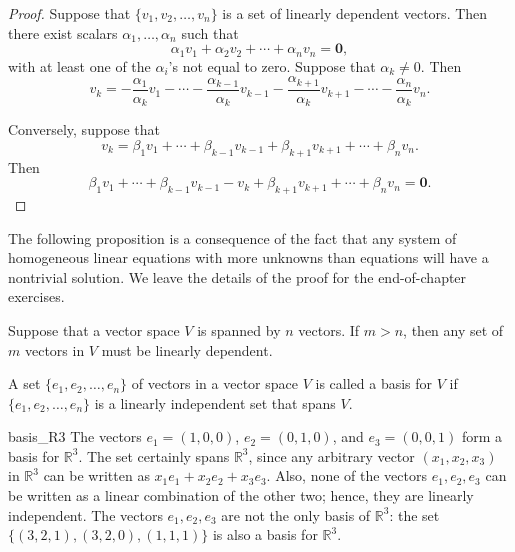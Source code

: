 \begin{proof}
Suppose that $\{ v_1, v_2, \dots, v_n \}$ is a set of linearly dependent
vectors.  Then there exist scalars $\alpha_1, \ldots, \alpha_n$
such that
\[
\alpha_1 v_1 + \alpha_2 v_2 + \cdots + \alpha_n v_n = {\mathbf 0 },
\]
with at least one of the $\alpha_i$'s not equal to zero.  Suppose that
$\alpha_k \neq 0$. Then 
\[
v_k = - \frac{\alpha_1}{\alpha_k} v_1 
- \cdots 
- \frac{\alpha_{k-1}}{\alpha_k}	v_{k-1}
- \frac{\alpha_{k+1}}{\alpha_k}	v_{k+1}
- \cdots 
- \frac{\alpha_n}{\alpha_k} v_n.
\]


Conversely, suppose that 
\[
v_k = \beta_1 v_1 
+ \cdots 
+ \beta_{k-1} v_{k-1}
+ \beta_{k+1} v_{k+1}
+ \cdots 
+ \beta_n v_n.
\]
Then
\[
\beta_1 v_1 
+ \cdots 
+ \beta_{k-1} v_{k-1}
- v_k
+ \beta_{k+1} v_{k+1}
+ \cdots 
+ \beta_n v_n = {\mathbf 0}.
\]
\end{proof}

\medskip


The following proposition is a consequence of the fact that any system
of homogeneous linear equations with more unknowns than equations will
have a nontrivial solution.  We leave the details of the proof for the
end-of-chapter exercises. 
 

\begin{proposition}\label{vect:linearlyindependent}
Suppose that a vector space $V$ is spanned by $n$ vectors. If $m > n$,
then any set of $m$ vectors in $V$ must be linearly dependent. 
\end{proposition}
 
  
A set $\{ e_1, e_2, \ldots, e_n \}$ of vectors in a vector space $V$
is called a {\bfi basis\/} for $V$ if $\{
e_1, e_2, \ldots, e_n \}$ is a linearly independent set that spans
$V$.

 
 
\begin{example}{basis_R3}
The vectors $e_1 = (1, 0, 0)$, $e_2 = (0, 1, 0)$, and $e_3 =(0, 0, 1)$
form a basis for ${\mathbb R}^3$.  The set certainly spans ${\mathbb R}^3$,
since any arbitrary vector $(x_1, x_2, x_3)$ in ${\mathbb R}^3$ can be
written as $x_1 e_1 + x_2 e_2 + x_3 e_3$. Also, none of the vectors
$e_1, e_2, e_3$ can be written as a linear combination of the other
two; hence, they are linearly independent.  The vectors $e_1, e_2,
e_3$ are not the only basis of ${\mathbb R}^3$:  the set $\{ (3, 2, 1),
(3, 2, 0), (1, 1, 1) \}$ is also a basis for ${\mathbb R}^3$. 
\end{example}

